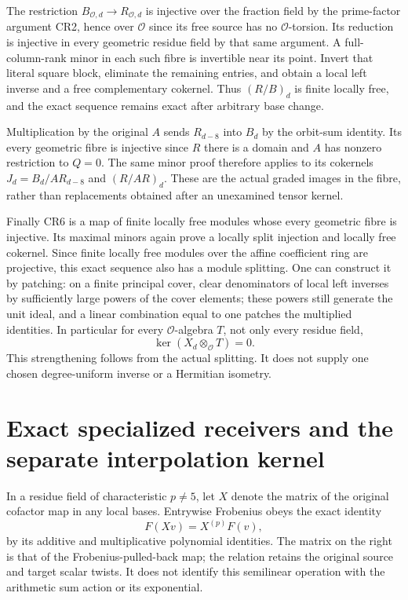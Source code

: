 \documentclass[11pt]{article}
\begin{document}
The restriction $B_{\mathcal O,d}\to R_{\mathcal O,d}$ is
injective over the fraction field by the prime-factor argument
CR2, hence over $\mathcal O$ since its free source has no
$\mathcal O$-torsion.  Its reduction is injective in every geometric
residue field by that same argument.  A full-column-rank minor
in each such fibre is invertible near its point.  Invert that
literal square block, eliminate the remaining entries, and obtain
a local left inverse and a free complementary cokernel.  Thus
$(R/B)_d$ is finite locally free, and the exact sequence remains
exact after arbitrary base change.

Multiplication by the original $A$ sends $R_{d-8}$ into $B_d$
by the orbit-sum identity.  Its every geometric fibre is injective
since $R$ there is a domain and $A$ has nonzero restriction to
$Q=0$.  The same minor proof therefore applies to its cokernels
$J_d=B_d/A R_{d-8}$ and $(R/AR)_d$.  These are the actual graded
images in the fibre, rather than replacements obtained after
an unexamined tensor kernel.

Finally CR6 is a map of finite locally free modules whose every
geometric fibre is injective.  Its maximal minors again prove
a locally split injection and locally free cokernel.  Since
finite locally free modules over the affine coefficient ring are
projective, this exact sequence also has a module splitting.
One can construct it by patching: on a finite principal cover,
clear denominators of local left inverses by sufficiently large
powers of the cover elements; these powers still generate the
unit ideal, and a linear combination equal to one patches the
multiplied identities.  In particular for every $\mathcal O$-algebra
$T$, not only every residue field,
\[
 \ker(X_d\otimes_\mathcal O T)=0.                              \tag{CR24}
\]
This strengthening follows from the actual splitting.  It does
not supply one chosen degree-uniform inverse or a Hermitian
isometry.

\section{Exact specialized receivers and the separate interpolation kernel}
In a residue field of characteristic $p\ne5$, let $X$ denote
the matrix of the original cofactor map in any local bases.
Entrywise Frobenius obeys the exact identity
\[
 F(Xv)=X^{(p)}F(v),                                             \tag{CR25}
\]
by its additive and multiplicative polynomial identities.  The
matrix on the right is that of the Frobenius-pulled-back map;
the relation retains the original source and target scalar twists.
It does not identify this semilinear operation with the arithmetic
sum action or its exponential.
\end{document}
